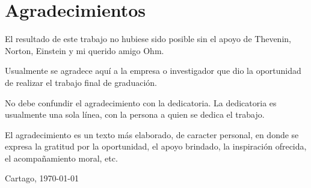 \chapter*{Agradecimientos}
\thispagestyle{empty}

El resultado de este trabajo no hubiese sido posible sin el apoyo de Thevenin,
Norton, Einstein y mi querido amigo Ohm.

Usualmente se agradece aquí a la empresa o investigador que dio la
oportunidad de realizar el trabajo final de graduación.

No debe confundir el agradecimiento con la dedicatoria.  La
dedicatoria es usualmente una sola línea, con la persona a quien se
dedica el trabajo.

El agradecimiento es un texto más elaborado, de caracter personal, en
donde se expresa la gratitud por la oportunidad, el apoyo brindado, la
inspiración ofrecida, el acompañamiento moral, etc.

\vspace*{1cm}

\thesisAuthor

Cartago, \today

\cleardoublepage

